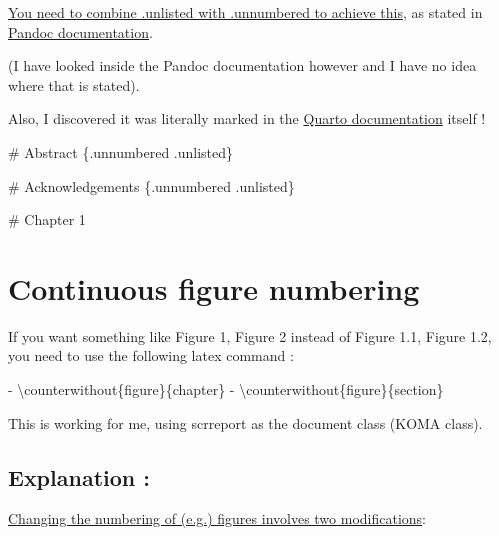 \documentclass[
  letterpaper,
  DIV=11,
  numbers=noendperiod]{scrreprt}
\newenvironment{Shaded}{\begin{snugshade}}{\end{snugshade}}
\newcommand{\FunctionTok}[1]{\textcolor[rgb]{0.28,0.35,0.67}{#1}}
\newcommand{\NormalTok}[1]{\textcolor[rgb]{0.00,0.23,0.31}{#1}}
\begin{document}
\href{https://stackoverflow.com/questions/49573734/do-not-include-section-in-toc-in-pandoc}{You
need to combine .unlisted with .unnumbered to achieve this}, as stated
in \href{https://pandoc.org/MANUAL.html\#heading-identifiers}{Pandoc
documentation}.

(I have looked inside the Pandoc documentation however and I have no
idea where that is stated).

Also, I discovered it was literally marked in the
\href{https://quarto.org/docs/output-formats/pdf-basics.html\#table-of-contents}{Quarto
documentation} itself !

\begin{Shaded}
\begin{Highlighting}[]
\NormalTok{\# Abstract \{.unnumbered .unlisted\}}

\NormalTok{\# Acknowledgements \{.unnumbered .unlisted\}}

\NormalTok{\# Chapter 1}
\end{Highlighting}
\end{Shaded}

\hypertarget{continuous-figure-numbering}{%
\section{Continuous figure
numbering}\label{continuous-figure-numbering}}

If you want something like Figure 1, Figure 2 instead of Figure 1.1,
Figure 1.2, you need to use the following latex command :

\begin{Shaded}
\begin{Highlighting}[]
\NormalTok{{-} }\FunctionTok{\textbackslash{}counterwithout}\NormalTok{\{figure\}\{chapter\} }
\NormalTok{{-} }\FunctionTok{\textbackslash{}counterwithout}\NormalTok{\{figure\}\{section\}}
\end{Highlighting}
\end{Shaded}

This is working for me, using scrreport as the document class (KOMA
class).

\hypertarget{explanation}{%
\subsection{\texorpdfstring{\textbf{Explanation}
:}{Explanation :}}\label{explanation}}

\href{https://imathworks.com/tex/tex-latex-continuous-v-per-chapter-section-numbering-of-figures-tables-and-other-document-elements/}{Changing
the numbering of (e.g.) figures involves two modifications}:
\end{document}
